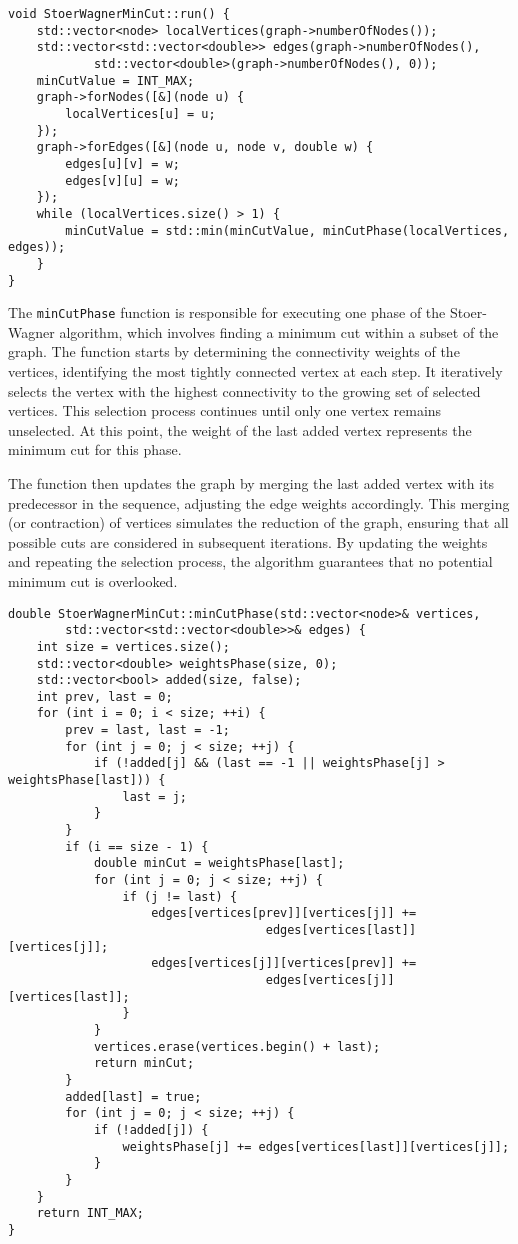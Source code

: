 \begin{verbatim}
void StoerWagnerMinCut::run() {
    std::vector<node> localVertices(graph->numberOfNodes());
    std::vector<std::vector<double>> edges(graph->numberOfNodes(),
            std::vector<double>(graph->numberOfNodes(), 0));
    minCutValue = INT_MAX;
    graph->forNodes([&](node u) {
        localVertices[u] = u;
    });
    graph->forEdges([&](node u, node v, double w) {
        edges[u][v] = w;
        edges[v][u] = w;
    });
    while (localVertices.size() > 1) {
        minCutValue = std::min(minCutValue, minCutPhase(localVertices, edges));
    }
}
\end{verbatim}

The \texttt{minCutPhase} function is responsible for executing one phase of the Stoer-Wagner algorithm, which involves finding a minimum cut within a subset of the graph. The function starts by determining the connectivity weights of the vertices, identifying the most tightly connected vertex at each step. It iteratively selects the vertex with the highest connectivity to the growing set of selected vertices. This selection process continues until only one vertex remains unselected. At this point, the weight of the last added vertex represents the minimum cut for this phase.

The function then updates the graph by merging the last added vertex with its predecessor in the sequence, adjusting the edge weights accordingly. This merging (or contraction) of vertices simulates the reduction of the graph, ensuring that all possible cuts are considered in subsequent iterations. By updating the weights and repeating the selection process, the algorithm guarantees that no potential minimum cut is overlooked.

\begin{verbatim}
double StoerWagnerMinCut::minCutPhase(std::vector<node>& vertices,
        std::vector<std::vector<double>>& edges) {
    int size = vertices.size();
    std::vector<double> weightsPhase(size, 0);
    std::vector<bool> added(size, false);
    int prev, last = 0;
    for (int i = 0; i < size; ++i) {
        prev = last, last = -1;
        for (int j = 0; j < size; ++j) {
            if (!added[j] && (last == -1 || weightsPhase[j] > weightsPhase[last])) {
                last = j;
            }
        }
        if (i == size - 1) {
            double minCut = weightsPhase[last];
            for (int j = 0; j < size; ++j) {
                if (j != last) {
                    edges[vertices[prev]][vertices[j]] += 
                                    edges[vertices[last]][vertices[j]];
                    edges[vertices[j]][vertices[prev]] += 
                                    edges[vertices[j]][vertices[last]];
                }
            }
            vertices.erase(vertices.begin() + last);
            return minCut;
        }
        added[last] = true;
        for (int j = 0; j < size; ++j) {
            if (!added[j]) {
                weightsPhase[j] += edges[vertices[last]][vertices[j]];
            }
        }
    }
    return INT_MAX;
}
\end{verbatim}

